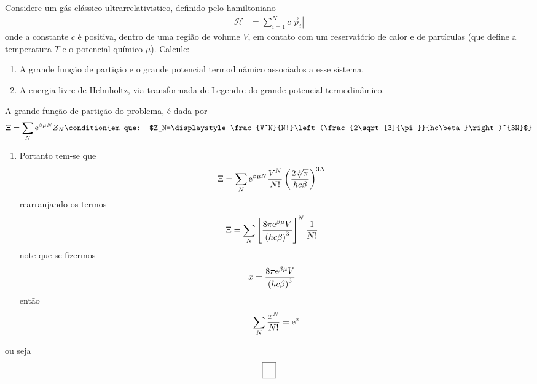 \begin{prob}
  Considere um gás clássico ultrarrelativistico, definido pelo hamiltoniano
  \begin{align}
    \mathcal{H}&=\sum_{i=1}^Nc|\vec{p}_i|
  \end{align}
  onde a constante $c$ é positiva, dentro de uma região de volume $V$, em contato com um reservatório de calor e de partículas (que define a temperatura $T$ e o potencial químico $\mu$). Calcule:
  \begin{enumerate}[label=\alph *)]
    \item A grande função de partição e o grande potencial termodinâmico associados a esse sistema.
    \item A energia livre de Helmholtz, via transformada de Legendre do grande potencial termodinâmico. 
  \end{enumerate}
  \begin{sol}
    A grande função de partição do problema, é dada por
    \begin{dmath}
      \Xi=\sum_N\E^{\beta \mu N}Z_N\condition{em que: $Z_N=\displaystyle\frac{V^N}{N!}\left(\frac{2\sqrt[3]{\pi}}{hc\beta}\right)^{3N}$}
    \end{dmath}
    \begin{enumerate}[label=\alph *)]
      \item Portanto tem-se que
      \begin{align}
        \Xi&=\sum_N\mathrm{e}^{\beta \mu N}\frac{V^N}{N!}\left(\frac{2\sqrt[3]{\pi}}{hc\beta}\right)^{3N}       
      \end{align}
      rearranjando os termos
      \begin{align}
        \begin{split}
          \Xi&=\sum_N\left[\frac{8\pi\mathrm{e}^{\beta \mu}V}{\left(hc\beta\right)^3}\right]^{N}\frac{1}{N!}
        \end{split}
      \end{align}
      note que se fizermos
      \begin{align}
        x&=\frac{8\pi\mathrm{e}^{\beta \mu}V}{\left(hc\beta\right)^3}
      \end{align}
      então
      \begin{align}
        \sum_N\frac{x^N}{N!}=\mathrm{e}^x
      \end{align}
    \end{enumerate}
    ou seja
    \begin{align}
      \addtolength{\fboxsep}{5pt}
      \boxed{
        \begin{gathered}

\end{gathered}}
\end{align}
\end{sol}
\end{prob}
